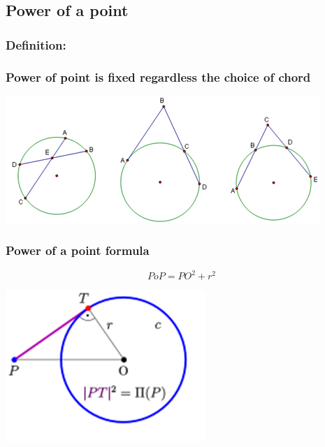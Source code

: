 \documentclass{article}
\begin{document}
\vspace{100px}

\subsection{Power of a point}

\subsubsection{Definition:}

\vspace{20px}

\subsubsection{Power of point is fixed regardless the choice of chord}

\includegraphics[scale=1.2]{Picture13.png}

\pagebreak

\subsubsection{Power of a point formula}

\[PoP = {PO}^2+r^2\]

\begin{center}
\includegraphics{Picture14.png}
\end{center}
\end{document}
